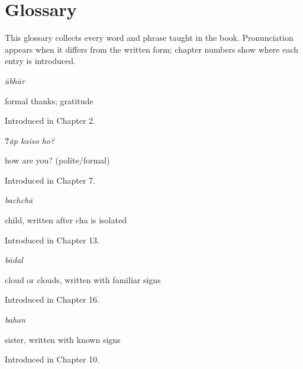 
\chapter*{Glossary}

This glossary collects every word and phrase taught in the book. Pronunciation appears when it differs from the written form; chapter numbers show where each entry is introduced.

\noindent\begin{minipage}[t]{\linewidth}
\raggedright
\textbf{}\enspace\emph{ābhār}\par
\small formal thanks; gratitude\par
\footnotesize Introduced in Chapter 2.
\end{minipage}\par\medskip

\noindent\begin{minipage}[t]{\linewidth}
\raggedright
\textbf{  ?}\enspace\emph{āp kaiso ho?}\par
\small how are you? (polite/formal)\par
\footnotesize Introduced in Chapter 7.
\end{minipage}\par\medskip

\noindent\begin{minipage}[t]{\linewidth}
\raggedright
\textbf{}\enspace\emph{bachchā}\par
\small child, written after cha is isolated\par
\footnotesize Introduced in Chapter 13.
\end{minipage}\par\medskip

\noindent\begin{minipage}[t]{\linewidth}
\raggedright
\textbf{}\enspace\emph{bādal}\par
\small cloud or clouds, written with familiar signs\par
\footnotesize Introduced in Chapter 16.
\end{minipage}\par\medskip

\noindent\begin{minipage}[t]{\linewidth}
\raggedright
\textbf{}\enspace\emph{bahan}\par
\small sister, written with known signs\par
\footnotesize Introduced in Chapter 10.
\end{minipage}\par\medskip

